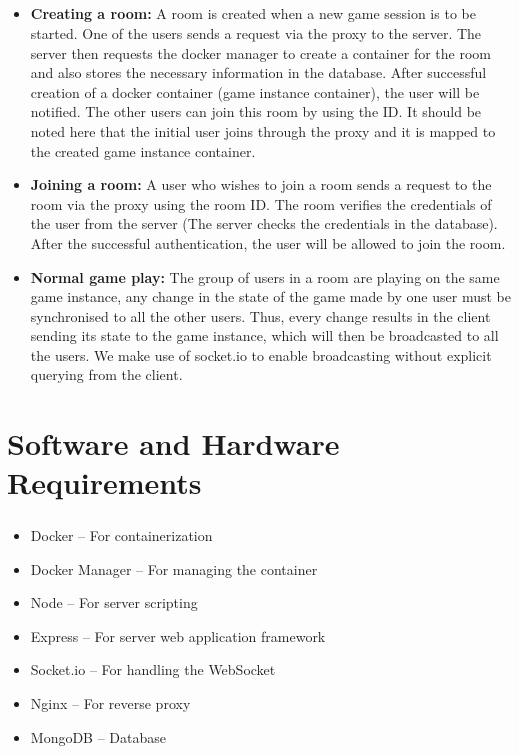 \documentclass[oneside,12pt]{Classes/VTU}
\begin{document}
	\paragraph{}
	\begin{itemize}
		\item \textbf{Creating a room: }A room is created when a new game session is to be started. One of the users sends a request via the proxy to the server. The server then requests the docker manager to create a container for the room and also stores the necessary information in the database. After successful creation of a docker container (game instance container), the user will be notified. The other users can join this room by using the ID. It should be noted here that the initial user joins through the proxy and it is mapped to the created game instance container. 
		
		\item \textbf{Joining a room: }A user who wishes to join a room sends a request to the room via the proxy using the room ID. The room verifies the credentials of the user from the server (The server checks the credentials in the database). After the successful authentication, the user will be allowed to join the room.
		
		\item \textbf{Normal game play: }The group of users in a room are playing on the same game instance, any change in the state of the game made by one user must be synchronised to all the other users. Thus, every change results in the client sending its state to the game instance, which will then be broadcasted to all the users. We make use of socket.io to enable broadcasting without explicit querying from the client.
		
	\end{itemize}	

\chapter{Software and Hardware Requirements}
	\thispagestyle{fancy}
	\paragraph{}
	\begin{itemize}
		\item Docker – For containerization
		\item Docker Manager – For managing the container
		\item Node – For server scripting
		\item Express – For server web application framework
		\item Socket.io – For handling the WebSocket
		\item Nginx – For reverse proxy
		\item MongoDB – Database
	\end{itemize}
\end{document}

